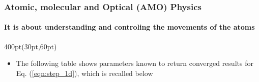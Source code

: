 \documentclass[10pt,aspectratio=169]{beamer}
\begin{document}

\begin{frame}
\frametitle{Atomic, molecular and Optical (AMO) Physics}
	\framesubtitle{It is about understanding and controling 
             the movements of the atoms}
\small

\begin{textblock*}{400pt}(30pt,60pt)
\footnotesize
\begin{itemize}
\item The following table shows parameters known to return converged results 
for Eq. (\ref{eqn:step_1d}), which is recalled below
\end{itemize}

\end{textblock*}

\vspace{20pt}


\end{frame}
\end{document}
